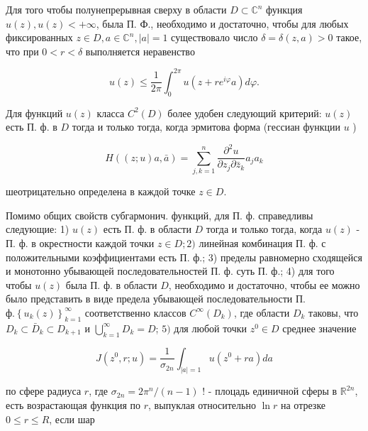 \documentclass[10pt]{article}
\begin{document}
Для того чтобы полунепрерывная сверху в области $D \subset \mathbb{C}^{n}$ функция $u(z), u(z)<+\infty$, была П. Ф., необходимо и достаточно, чтобы для любых фиксированных $z \in D, a \in \mathbb{C}^{n},|a|=1$ существовало число $\delta=\delta(z, a)>0$ такое, что при $0<r<\delta$ выполняется неравенство



\[

u(z) \leqslant \frac{1}{2 \pi} \int_{0}^{2 \pi} u\left(z+r e^{i \varphi} a\right) d \varphi .

\]



Для функций $u(z)$ класса $C^{2}(D)$ более удобен следующий критерий: $u(z)$ есть П. ф. в $D$ тогда и только тогда, когда эрмитова форма (гессиан функции $u$ )



\[

H((z ; u) a, \bar{a})=\sum_{j, k=1}^{n} \frac{\partial^{2} u}{\partial z_{j} \partial \bar{z}_{k}} a_{j} a_{k}

\]



шеотрицательно определена в каждой точке $z \in D$.



Помимо общих свойств субгармонич. функций, для П. ф. справедливы следующие: 1) $u(z)$ есть П. ф. в области $D$ тогда и только тогда, когда $u(z)$ - П. ф. в окрестности каждой точки $z \in D ; 2)$ линейная комбинация П. ф. с положительными коэффициентами есть П. ф.; 3) пределы равномерно сходящейся и монотонно убывающей последовательностей П. ф. суть П. ф.; 4) для того чтобы $u(z)$ была П. ф. в области $D$, необходимо и достаточно, чтобы ее можно было представить в виде предела убывающей последовательности П. $ф .\left\{u_{k}(z)\right\}_{k=1}^{\infty}$ соответственно классов $C^{\infty}\left(D_{k}\right)$, где области $D_{k}$ таковы, что $D_{k} \subset \bar{D}_{k} \subset D_{k+1}$ и $\bigcup_{k=1}^{\infty} D_{k}=D$; $5)$ для любой точки $z^{0} \in D$ среднее значение



\[

J\left(z^{0}, r ; u\right)=\frac{1}{\sigma_{2 n}} \int_{|a|=1} u\left(z^{0}+r a\right) d a

\]



по сфере радиуса $r$, где $\sigma_{2 n}=2 \pi^{n} /(n-1)$ ! - плоцадь единичной сферы в $\mathbb{R}^{2 n}$, есть возрастающая функция по $r$, выпуклая относительно $\ln r$ на отрезке $0 \leqslant r \leqslant R$, если шар
\end{document}
